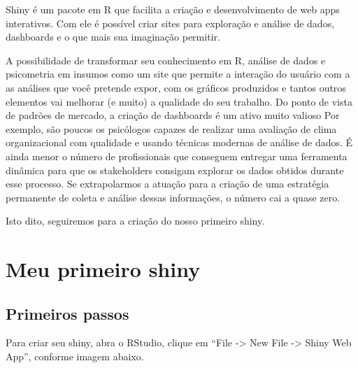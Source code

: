 \documentclass[
]{book}
\begin{document}
Shiny é um pacote em R que facilita a criação e desenvolvimento de web apps interativos. Com ele é possível criar sites para exploração e análise de dados, dashboards e o que mais sua imaginação permitir.

A possibilidade de transformar seu conhecimento em R, análise de dados e psicometria em insumos como um site que permite a interação do usuário com a as análises que você pretende expor, com os gráficos produzidos e tantos outros elementos vai melhorar (e muito) a qualidade do seu trabalho. Do ponto de vista de padrões de mercado, a criação de dashboards é um ativo muito valioso Por exemplo, são poucos os psicólogos capazes de realizar uma avaliação de clima organizacional com qualidade e usando técnicas modernas de análise de dados. É ainda menor o número de profissionais que conseguem entregar uma ferramenta dinâmica para que os stakeholders consigam explorar os dados obtidos durante esse processo. Se extrapolarmos a atuação para a criação de uma estratégia permanente de coleta e análise dessas informações, o número cai a quase zero.

Isto dito, seguiremos para a criação do nosso primeiro shiny.

\hypertarget{meu-primeiro-shiny}{%
\section{Meu primeiro shiny}\label{meu-primeiro-shiny}}

\hypertarget{primeiros-passos}{%
\subsection{Primeiros passos}\label{primeiros-passos}}

Para criar seu shiny, abra o RStudio, clique em ``File -\textgreater{} New File -\textgreater{} Shiny Web App'', conforme imagem abaixo.
\end{document}
